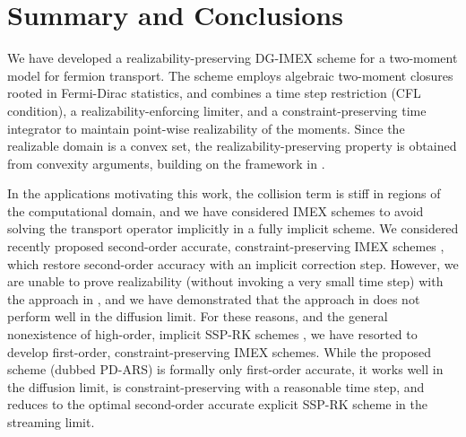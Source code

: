 \section{Summary and Conclusions}
\label{sec:conclusions}

We have developed a realizability-preserving DG-IMEX scheme for a two-moment model for fermion transport.  
The scheme employs algebraic two-moment closures rooted in Fermi-Dirac statistics, and combines a time step restriction (CFL condition), a realizability-enforcing limiter, and a constraint-preserving time integrator to maintain point-wise realizability of the moments.  
Since the realizable domain is a convex set, the realizability-preserving property is obtained from convexity arguments, building on the framework in \cite{zhangShu_2010a}.  

In the applications motivating this work, the collision term is stiff in regions of the computational domain, and we have considered IMEX schemes to avoid solving the transport operator implicitly in a fully implicit scheme.  
We considered recently proposed second-order accurate, constraint-preserving IMEX schemes \cite{chertock_etal_2015,hu_etal_2018}, which restore second-order accuracy with an implicit correction step.  
However, we are unable to prove realizability (without invoking a very small time step) with the approach in \cite{chertock_etal_2015}, and we have demonstrated that the approach in \cite{hu_etal_2018} does not perform well in the diffusion limit.  
For these reasons, and the general nonexistence of high-order, implicit SSP-RK schemes \cite{gottlieb_etal_2001}, we have resorted to develop first-order, constraint-preserving IMEX schemes.  
While the proposed scheme (dubbed PD-ARS) is formally only first-order accurate, it works well in the diffusion limit, is constraint-preserving with a reasonable time step, and reduces to the optimal second-order accurate explicit SSP-RK scheme in the streaming limit.  


